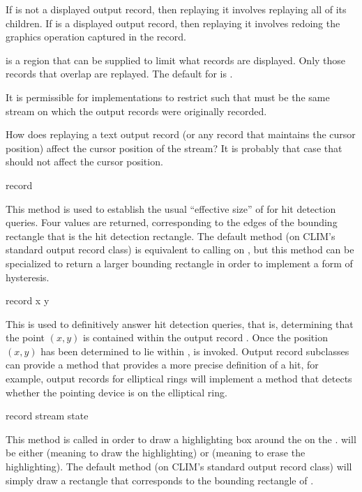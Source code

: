 If  is not a displayed output record, then replaying it involves
replaying all of its children.  If  is a displayed output record,
then replaying it involves redoing the graphics operation captured in the
record.

 is a region that can be supplied to limit what records are
displayed.  Only those records that overlap  are replayed.  The
default for  is .

It is permissible for implementations to restrict  such
that  must be the same stream on which the output records were
originally recorded.

 {How does replaying a text output record (or any record that
maintains the cursor position) affect the cursor position of the stream?  It
is probably that case that  should not affect the cursor position.}


 {record}

This method is used to establish the usual ``effective size'' of 
for hit detection queries.  Four values are returned, corresponding to the edges
of the bounding rectangle that is the hit detection rectangle.  The default
method (on CLIM's standard output record class) is equivalent to calling
 on , but this method can be specialized to
return a larger bounding rectangle in order to implement a form of hysteresis.

 {record x y}

This is used to definitively answer hit detection queries, that is, determining
that the point $(x,y)$ is contained within the output record .  Once
the position $(x,y)$ has been determined to lie within
,
 is invoked.  Output record
subclasses can provide a method that provides a more precise definition of a
hit, for example, output records for elliptical rings will implement a method
that detects whether the pointing device is on the elliptical ring.

 {record stream state}

This method is called in order to draw a highlighting box around the
  on the 
.   will be either  (meaning to draw the
highlighting) or  (meaning to erase the highlighting).  The
default method (on CLIM's standard output record class) will simply draw a
rectangle that corresponds to the bounding rectangle of .

